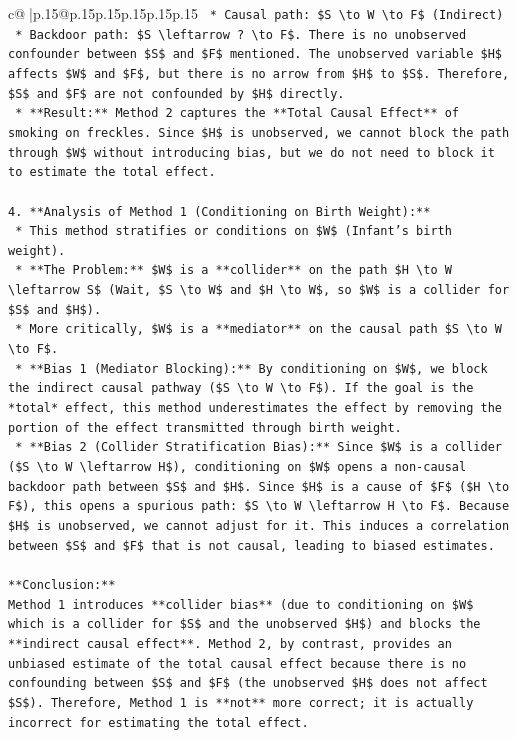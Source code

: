 \documentclass{article}
\begin{document}
{\begin{supertabular}{c@{$\;$}|p{.15\linewidth}@{}p{.15\linewidth}p{.15\linewidth}p{.15\linewidth}p{.15\linewidth}p{.15\linewidth}}
{{{\texttt{        *   Causal path: \$S \textbackslash{}to W \textbackslash{}to F\$ (Indirect)} \\
\texttt{        *   Backdoor path: \$S \textbackslash{}leftarrow ? \textbackslash{}to F\$. There is no unobserved confounder between \$S\$ and \$F\$ mentioned. The unobserved variable \$H\$ affects \$W\$ and \$F\$, but there is no arrow from \$H\$ to \$S\$. Therefore, \$S\$ and \$F\$ are not confounded by \$H\$ directly.} \\
\texttt{    *   **Result:** Method 2 captures the **Total Causal Effect** of smoking on freckles. Since \$H\$ is unobserved, we cannot block the path through \$W\$ without introducing bias, but we do not need to block it to estimate the total effect.} \\
\\ 
\texttt{4.  **Analysis of Method 1 (Conditioning on Birth Weight):**} \\
\texttt{    *   This method stratifies or conditions on \$W\$ (Infant's birth weight).} \\
\texttt{    *   **The Problem:** \$W\$ is a **collider** on the path \$H \textbackslash{}to W \textbackslash{}leftarrow S\$ (Wait, \$S \textbackslash{}to W\$ and \$H \textbackslash{}to W\$, so \$W\$ is a collider for \$S\$ and \$H\$).} \\
\texttt{    *   More critically, \$W\$ is a **mediator** on the causal path \$S \textbackslash{}to W \textbackslash{}to F\$.} \\
\texttt{    *   **Bias 1 (Mediator Blocking):** By conditioning on \$W\$, we block the indirect causal pathway (\$S \textbackslash{}to W \textbackslash{}to F\$). If the goal is the *total* effect, this method underestimates the effect by removing the portion of the effect transmitted through birth weight.} \\
\texttt{    *   **Bias 2 (Collider Stratification Bias):** Since \$W\$ is a collider (\$S \textbackslash{}to W \textbackslash{}leftarrow H\$), conditioning on \$W\$ opens a non{-}causal backdoor path between \$S\$ and \$H\$. Since \$H\$ is a cause of \$F\$ (\$H \textbackslash{}to F\$), this opens a spurious path: \$S \textbackslash{}to W \textbackslash{}leftarrow H \textbackslash{}to F\$. Because \$H\$ is unobserved, we cannot adjust for it. This induces a correlation between \$S\$ and \$F\$ that is not causal, leading to biased estimates.} \\
\\ 
\texttt{**Conclusion:**} \\
\texttt{Method 1 introduces **collider bias** (due to conditioning on \$W\$ which is a collider for \$S\$ and the unobserved \$H\$) and blocks the **indirect causal effect**. Method 2, by contrast, provides an unbiased estimate of the total causal effect because there is no confounding between \$S\$ and \$F\$ (the unobserved \$H\$ does not affect \$S\$). Therefore, Method 1 is **not** more correct; it is actually incorrect for estimating the total effect.} \\
}}}
\end{supertabular}}
\end{document}
